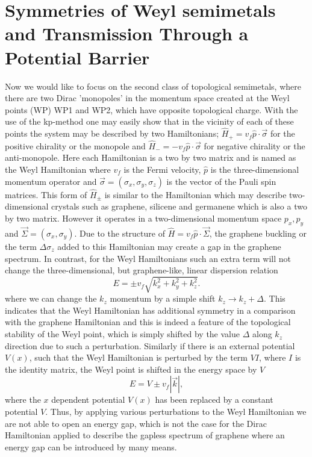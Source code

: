 \documentclass[prb,twocolumn,aps,superscriptaddress,showpacs,floatfix]{revtex4}
\begin{document}
\section{Symmetries of Weyl semimetals and Transmission Through a Potential Barrier}
	Now we would like to focus on the second class of topological semimetals, where there are two Dirac 'monopoles' in the momentum space created at the Weyl points (WP) WP1 and WP2, which have opposite topological charge. With the use of the kp-method\cite{Bir-1974} one may easily show that in the vicinity of each of these points the system may be described by two Hamiltonians;  $\hat{H}_{+}=v_{f}\hat{p}\cdot\vec{\sigma}$ for the positive chirality or the monopole and $\hat{H}_{-}=-v_{f}\hat{p}\cdot\vec{\sigma}$ for negative chirality or the anti-monopole. Here each Hamiltonian is a two by two matrix and is named as the Weyl Hamiltonian \cite{p3,b50,b51,c4} where $v_{f}$ is the Fermi velocity, $\hat{p}$ is the three-dimensional momentum operator and $\vec{\sigma}=(\sigma_x,\sigma_y,\sigma_z)$ is the vector of the Pauli spin matrices. This form of $\hat{H}_{\pm}$ is similar to the Hamiltonian which may describe two-dimensional crystals such as graphene, silicene and germanene\cite{opto9} which is also a two by two matrix. However it operates in a two-dimensional momentum space $p_x,p_y$ and $\vec{{\Sigma}}=(\sigma_x,\sigma_y)$. Due to the structure of $\hat{H}=v_{f}\hat{p}\cdot\vec{\Sigma}$, the graphene buckling or the term $\Delta\sigma_z$ added to this Hamiltonian may create a gap in the graphene spectrum\cite{opto9}. In contrast, for the Weyl Hamiltonians such an extra term will not change the three-dimensional, but graphene-like, linear dispersion relation
\begin{equation}
	E=\pm v_{f}\sqrt{k_{x}^{2}+k_{y}^{2}+k_{z}^{2}}.
\end{equation}
where we can change the $k_z$ momentum by a simple shift $k_z\rightarrow k_z+\Delta$. This indicates that the Weyl Hamiltonian has additional symmetry in a comparison with the graphene Hamiltonian\cite{opto9} and this is indeed a feature of the topological stability of the Weyl point, which is simply shifted by the value $\Delta$ along $k_z$ direction due to such a perturbation. Similarly if there is an external potential $V(x)$, such that the Weyl Hamiltonian is perturbed by the term $V I$, where $I$ is the identity matrix, the Weyl point is shifted in the energy space by $V$
\begin{equation}
	E=V\pm v_{f}{|\vec{k}|},
\end{equation}
	where the $x$ dependent potential $V(x)$ has been replaced by a constant potential $V$. Thus, by applying various perturbations to the Weyl Hamiltonian we are not able to open an energy gap, which is not the case for the Dirac Hamiltonian applied to describe the gapless spectrum of graphene where an energy gap can be introduced by many means\cite{Pototsky,Yung-2013,Liu-2015}.	
	
\end{document}
